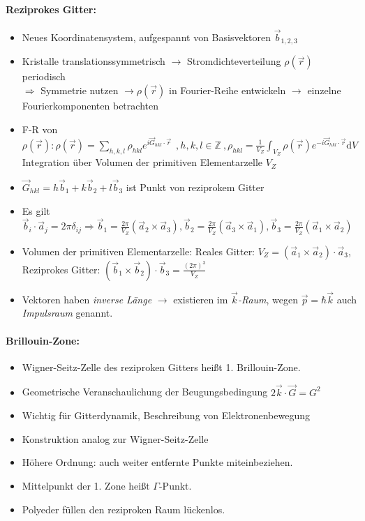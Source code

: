 \documentclass[a4paper,12pt]{article}
\begin{document}
\paragraph*{Reziprokes Gitter:}\begin{itemize}
	\item Neues Koordinatensystem, aufgespannt von Basisvektoren $ \vec b_{1,2,3} $
	\item Kristalle translationssymmetrisch $ \rightarrow $ Stromdichteverteilung $ \rho(\vec r) $ periodisch\\
	$ \Rightarrow $ Symmetrie nutzen $ \rightarrow \rho(\vec r)$ in Fourier-Reihe entwickeln $ \rightarrow $ einzelne Fourierkomponenten betrachten
	\item F-R von $ \rho(\vec r): \rho(\vec r) = \sum\limits_{h,k,l} \rho_{hkl}e^{i \vec G_{hkl} \cdot \vec r}~~, h, k, l \in \mathbb Z ~, \rho_{hkl} = \frac{1}{V_Z} \int_{V_Z} \rho(\vec r) e^{-i\vec G_{hkl} \cdot \vec r}\mathrm{d}V $ Integration über Volumen der primitiven Elementarzelle $ V_Z $
	\item $ \vec G_{hkl} = h \vec b_1 + k \vec b_2 + l \vec b_3 $ ist Punkt von reziprokem Gitter
	\item Es gilt $ \vec b_i \cdot  \vec a_j = 2 \pi \delta_{ij} \Rightarrow \vec b_1 = \frac{2\pi}{V_Z} \left(\vec a_2 \times \vec a_3\right), \vec b_2 = \frac{2\pi}{V_Z} \left(\vec a_3 \times \vec a_1\right) , \vec b_3 = \frac{2\pi}{V_Z} \left(\vec a_1 \times \vec a_2\right)  $
	\item Volumen der primitiven Elementarzelle: Reales Gitter: $ V_Z = \left(\vec a_1 \times \vec a_2\right)\cdot \vec a_3 $, Reziprokes Gitter: $ \left(\vec b_1 \times \vec b_2\right)\cdot \vec b_3 = \frac{(2\pi)^3}{V_Z} $
	\item Vektoren haben \emph{inverse Länge} $ \rightarrow $ existieren im \emph{$ \vec k $-Raum}, wegen $ \vec p = \hbar \vec k  $ auch \emph{Impulsraum} genannt.
\end{itemize}
\paragraph*{Brillouin-Zone:}\begin{itemize}
	\item Wigner-Seitz-Zelle des reziproken Gitters heißt 1. Brillouin-Zone.
	\item Geometrische Veranschaulichung der Beugungsbedingung $ 2 \vec k \cdot \vec G  = G^2$
	\item Wichtig für Gitterdynamik, Beschreibung von Elektronenbewegung
	\item Konstruktion analog zur Wigner-Seitz-Zelle
	\item Höhere Ordnung: auch weiter entfernte Punkte miteinbeziehen.
	\item Mittelpunkt der 1. Zone heißt $ \Gamma $-Punkt.
	\item Polyeder füllen den reziproken Raum lückenlos.
\end{itemize}
\end{document}
